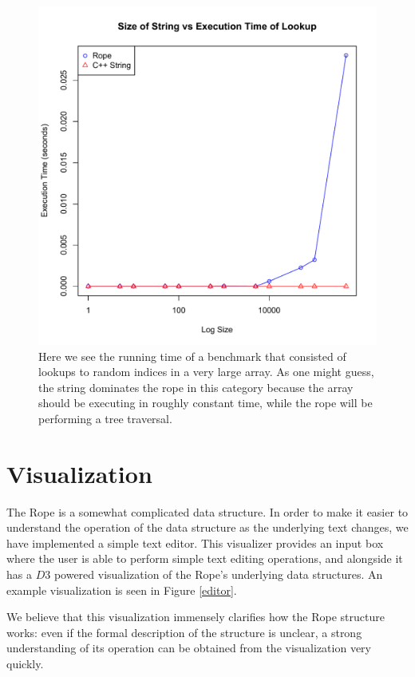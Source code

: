 \documentclass[12pt]{article}
\begin{document}
\begin{figure}[p]
\begin{centering}
\includegraphics[scale=1.0]{size_vs_lookup}
\caption{Here we see the running time of a benchmark that consisted of lookups to random indices in a very large array. As one might guess, the string dominates the rope in this category because the array should be executing in roughly constant time, while the rope will be performing a tree traversal.}
\end{centering}
\end{figure}
\FloatBarrier
\section{Visualization}

The Rope is a somewhat complicated data structure. In order to make it easier to understand the operation of the data structure as the underlying text changes, we have implemented a simple text editor. This visualizer provides an input box where the user is able to perform simple text editing operations, and alongside it has a $D3$ powered visualization of the Rope's underlying data structures. An example visualization is seen in Figure \ref{editor}.

We believe that this visualization immensely clarifies how the Rope structure works: even if the formal description of the structure is unclear, a strong understanding of its operation can be obtained from the visualization very quickly.
\end{document}
